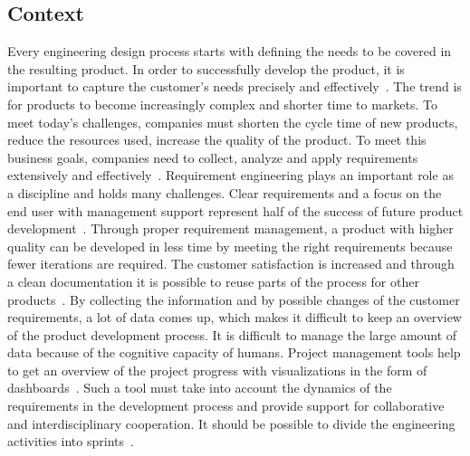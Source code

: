     \subsection*{Context}
    Every engineering design process starts with defining the needs to be covered in the resulting product. In order to successfully develop the product, it is important to capture the customer's needs precisely and effectively~\cite{liu2012scenario}.
    The trend is for products to become increasingly complex and shorter time to markets.
    To meet today's challenges, companies must shorten the cycle time of new products, reduce the resources used, increase the quality of the product. To meet this business goals, companies need to collect, analyze and apply requirements extensively and effectively~\cite{Ahti2005}.
    Requirement engineering plays an important role as a discipline and holds many challenges. Clear requirements and a focus on the end user with management support represent half of the success of future product development~\cite{6226784}.
    Through proper requirement management, a product with higher quality can be developed in less time by meeting the right requirements because fewer iterations are required. The customer satisfaction is increased and through a clean documentation it is possible to reuse parts of the process for other products~\cite{BAXTER2008585}.
    By collecting the information and by possible changes of the customer requirements, a lot of data comes up, which makes it difficult to keep an overview of the product development process. It is difficult to manage the large amount of data because of the cognitive capacity of humans. Project management tools help to get an overview of the project progress with visualizations in the form of dashboards~\cite{RICHTER2020271}.
    Such a tool must take into account the dynamics of the requirements in the development process and provide support for collaborative and interdisciplinary cooperation. It should be possible to divide the engineering activities into sprints~\cite{liu2012scenario}.
    
    
